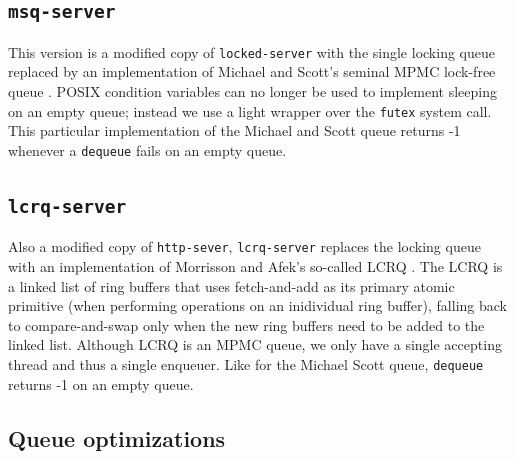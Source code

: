 \documentclass[twoside,10pt]{article}
\begin{document}
\begin{multicols}{2}
\subsection{\texttt{msq-server}}

This version is a modified copy of \verb+locked-server+ with the single
locking queue replaced by an implementation of Michael and Scott's
seminal MPMC lock-free queue \cite{synch-1.0.1}. POSIX
condition variables can no longer be used to implement sleeping on an
empty queue; instead we use a light wrapper over the \verb+futex+ system
call. This particular implementation of the Michael and Scott queue
returns -1 whenever a \verb+dequeue+ fails on an empty queue. 

\subsection{\texttt{lcrq-server}}

Also a modified copy of \verb+http-sever+, \verb+lcrq-server+ replaces
the locking queue with an implementation of Morrisson and Afek's
so-called LCRQ \cite{lcrq-source}. The LCRQ is a linked list of ring buffers that uses
fetch-and-add as its primary atomic primitive (when performing
operations on an inidividual ring buffer), falling back to
compare-and-swap only when the new ring buffers need to be added to
the linked list. Although LCRQ is an MPMC queue, we only have a single
accepting thread and thus a single enqueuer. Like for the Michael
Scott queue, \verb+dequeue+ returns -1 on an empty queue. 

\subsection{Queue optimizations}


\end{multicols}
\end{document}
